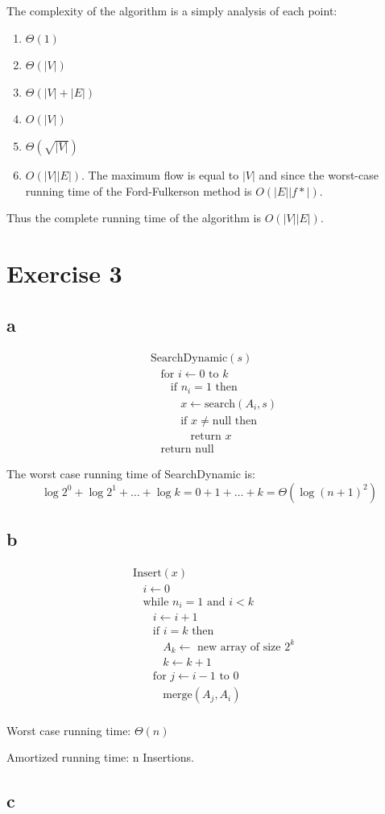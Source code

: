 \documentclass[koma,a4paper]{article}
\begin{document}
The complexity of the algorithm is a simply analysis of each point:

\begin{enumerate}
  \item $\Theta(1)$
  \item $\Theta\left(|V|\right)$
  \item $\Theta\left(|V| + |E|\right)$
  \item $O(|V|)$
  \item $\Theta\left(\sqrt{|V|}\right)$
  \item $O\left(|V||E|\right)$. The maximum flow is equal to $|V|$ and since the worst-case running time of the Ford-Fulkerson method is $O\left(|E||f*|\right)$.
\end{enumerate}

Thus the complete running time of the algorithm is $O\left(|V||E|\right)$.

\section{Exercise 3}
\subsection{a}
\begin{align*}
  &\text{SearchDynamic}(s)\\
  &~~~~\text{for } i \leftarrow 0 \text{ to } k\\
  &~~~~~~~~\text{if } n_i = 1 \text{ then}\\
  &~~~~~~~~~~~~x \leftarrow \text{search}(A_i, s)\\
  &~~~~~~~~~~~~\text{if } x \neq \text{null} \text{ then}\\
  &~~~~~~~~~~~~~~~~\text{return } x\\
  &~~~~\text{return null}
\end{align*}

The worst case running time of SearchDynamic is: $$\log{2}^0 + \log{2}^1 + \dots + \log{k} = 0 + 1 + \dots + k = \Theta\left(\log{(n+1)}^2\right)$$

\subsection{b}
\begin{align*}
  &\text{Insert}(x)\\
  &~~~~i \leftarrow 0\\
  &~~~~\text{while } n_i = 1 \text{ and } i < k\\
  &~~~~~~~~i \leftarrow i + 1\\
  &~~~~~~~~\text{if } i = k \text{ then}\\
  &~~~~~~~~~~~~A_k \leftarrow \text{ new array of size } 2^k\\
  &~~~~~~~~~~~~k \leftarrow k + 1\\
  &~~~~~~~~\text{for } j \leftarrow i - 1 \text{ to } 0\\
  &~~~~~~~~~~~~\text{merge}(A_j, A_i)\\
\end{align*}

Worst case running time: $\Theta(n)$

Amortized running time: n Insertions. 

\subsection{c}
\end{document}
